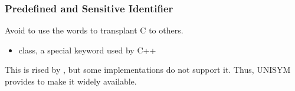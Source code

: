 
\subsubsection{Predefined and Sensitive Identifier}

Avoid to use the words to transplant C to others.

\begin{itemize}
	\item class, a special keyword used by C++
\end{itemize}


This is rised by \cite{StdC99}, but some implementations do not support it.
Thus, UNISYM provides  to make it widely available.




